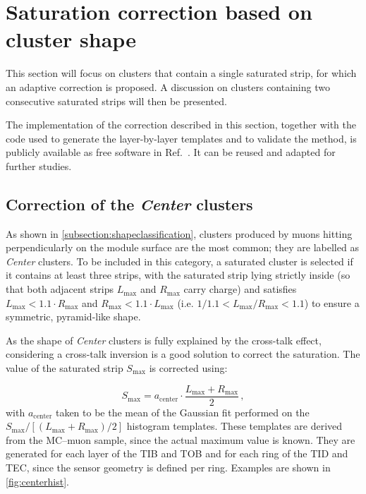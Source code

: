 \section{Saturation correction based on cluster shape}
\label{sec:Saturation_correction_cluster_shape}
This section will focus on clusters that contain a single saturated strip, for which an adaptive correction is proposed. A discussion on clusters containing two consecutive saturated strips will then be presented.

\vspace{0.5 cm}

The implementation of the correction described in this section, together with the code used to generate the layer-by-layer templates and to validate the method, is publicly available as free software in Ref.~\cite{ShapeCorrGit}. It can be reused and adapted for further studies.

\subsection{Correction of the \textit{Center} clusters}

As shown in \cref{subsection:shapeclassification}, clusters produced by muons hitting perpendicularly on the module surface are the most common; they are labelled as \textit{Center} clusters. To be included in this category, a saturated cluster is selected if it contains at least three strips, with the saturated strip lying strictly inside (so that both adjacent strips $L_{\mathrm{max}}$ and $R_{\mathrm{max}}$ carry charge) and satisfies $L_{\mathrm{max}} < 1.1\cdot R_{\mathrm{max}}$ and $R_{\mathrm{max}} < 1.1\cdot L_{\mathrm{max}}$ (i.e. $1/1.1 < L_{\mathrm{max}}/R_{\mathrm{max}} < 1.1$) to ensure a symmetric, pyramid-like shape.

As the shape of \textit{Center} clusters is fully explained by the cross-talk effect, considering a cross-talk inversion is a good solution to correct the saturation. The value of the saturated strip $S_\mathrm{max}$ is corrected using:

\begin{equation}
    S_\mathrm{max} = a_{\mathrm{center}} \cdot \frac{L_{\mathrm{max}} + R_{\mathrm{max}}}{2} \, ,
    \label{eq:CenterCorr}
\end{equation}
with $a_{\mathrm{center}}$ taken to be the mean of the Gaussian fit performed on the $S_\mathrm{max}/[(L_{\mathrm{max}} + R_{\mathrm{max}})/2]$ histogram templates. These templates are derived from the MC--muon sample, since the actual maximum value is known. They are generated for each layer of the TIB and TOB and for each ring of the TID and TEC, since the sensor geometry is defined per ring. Examples are shown in \cref{fig:centerhist}.

